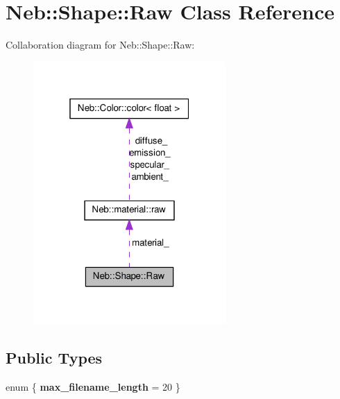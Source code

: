 \hypertarget{classNeb_1_1Shape_1_1Raw}{\section{\-Neb\-:\-:\-Shape\-:\-:\-Raw \-Class \-Reference}
\label{classNeb_1_1Shape_1_1Raw}
}


\-Collaboration diagram for \-Neb\-:\-:\-Shape\-:\-:\-Raw\-:\nopagebreak
\begin{figure}[H]
\begin{center}
\leavevmode
\includegraphics[width=208pt]{classNeb_1_1Shape_1_1Raw__coll__graph}
\end{center}
\end{figure}
\subsection*{\-Public \-Types}
\begin{DoxyCompactItemize}
\item 
enum \{ {\bfseries max\-\_\-filename\-\_\-length} =  20
 \}
\end{DoxyCompactItemize}
